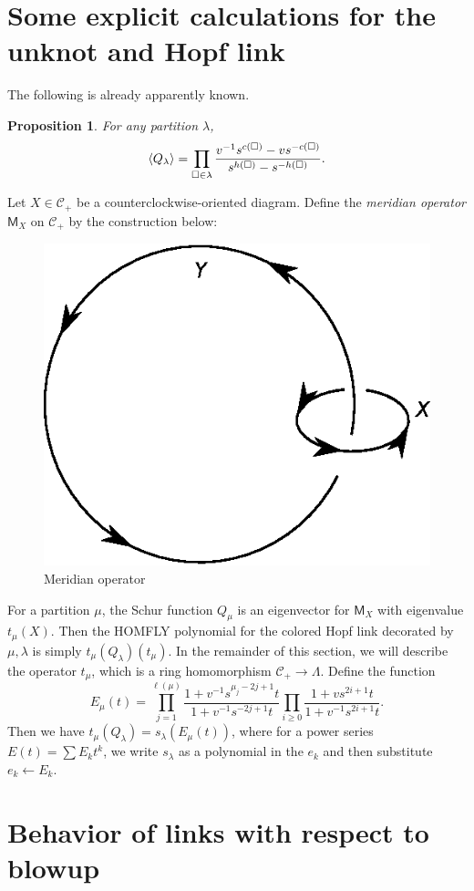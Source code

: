 \documentclass[leqno, openany]{memoir}
\newtheorem{prop}[thm]{Proposition}
\theoremstyle{definition}
\theoremstyle{remark}
\theoremstyle{plain}
\theoremstyle{definition}
\theoremstyle{remark}
\newcommand{\mc}[1]{\mathcal{#1}}
\newcommand{\ms}[1]{\mathsf{#1}}
\newcommand{\1}{\mathbf{1}}
\newcommand{\2}{\mathbf{2}}
\newcommand{\3}{\mathbf{3}}
\begin{document}
\section{Some explicit calculations for the unknot and Hopf link}%
\label{sec:some_explicit_calculations_for_the_unknot_and_hopf_link}

The following is already apparently known.
\begin{prop}
    For any partition $\lambda$, 
    \[ \ev{Q_{\lambda}} = \prod_{\square \in \lambda} \frac{v^{-1} s^{c(\square)} - v s^{-c(\square)}}{s^{h(\square)} - s^{-h(\square)}}. \]
\end{prop}

Let $X \in \mc{C}_+$ be a counterclockwise-oriented diagram. Define the \textit{meridian operator} $\ms{M}_X$ on $\mc{C}_+$ by the construction below:
\begin{figure}[H]
    \centering
    \includegraphics[width=0.2\linewidth]{mer6.eps}
    \caption{Meridian operator}%
    \label{fig:mer6}
\end{figure}
For a partition $\mu$, the Schur function $Q_{\mu}$ is an eigenvector for $\ms{M}_X$ with eigenvalue $t_{\mu}(X)$. Then the HOMFLY polynomial for the colored Hopf link decorated by $\mu, \lambda$ is simply $t_{\mu}(Q_{\lambda})(t_{\mu})$. In the remainder of this section, we will describe the operator $t_{\mu}$, which is a ring homomorphism $\mc{C}_+ \to \Lambda$. Define the function
\[ E_{\mu}(t) = \prod_{j=1}^{\ell(\mu)} \frac{1+v^{-1}s^{\mu_j - 2j + 1}t}{1+v^{-1}s^{-2j+1}t} \prod_{i \geq 0} \frac{1+v s^{2i+1}t}{1+v^{-1}s^{2i+1}t}. \]
Then we have $t_{\mu}(Q_{\lambda}) = s_{\lambda}(E_{\mu}(t))$, where for a power series $E(t) = \sum E_k t^k$, we write $s_{\lambda}$ as a polynomial in the $e_k$ and then substitute $e_k \gets E_k$.

\section{Behavior of links with respect to blowup}%
\label{sec:behavior_of_links_with_respect_to_blowup}
\end{document}
